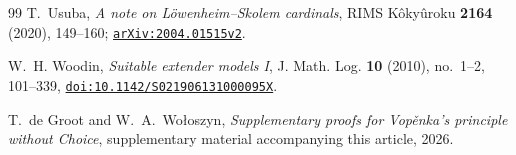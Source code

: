 \documentclass[11pt,a4paper]{amsart}
\theoremstyle{plain}
\theoremstyle{definition}
\theoremstyle{remark}
\begin{document}
\begin{thebibliography}{99}
T.~Usuba,
\emph{A note on L\"owenheim--Skolem cardinals},
RIMS K\^oky\^uroku \textbf{2164} (2020), 149--160;
\href{https://arxiv.org/abs/2004.01515}{\nolinkurl{arXiv:2004.01515v2}}.

W.~H. Woodin,
\emph{Suitable extender models I},
J. Math. Log. \textbf{10} (2010), no.~1--2, 101--339,
\href{https://doi.org/10.1142/S021906131000095X}{\nolinkurl{doi:10.1142/S021906131000095X}}.

T.~de Groot and W.~A.~Wo{\l}oszyn,
\emph{Supplementary proofs for Vop\v{e}nka's principle without Choice},
supplementary material accompanying this article, 2026.

\end{thebibliography}
\end{document}
